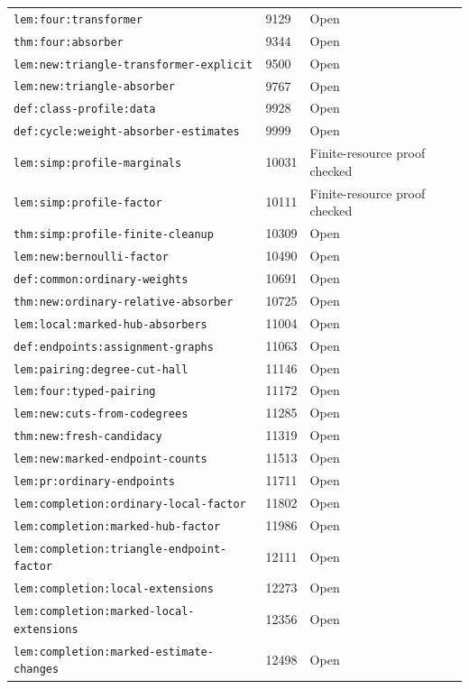 \begin{tabular}{lll}
\nolinkurl{lem:four:transformer} & 9129 & Open \\
\nolinkurl{thm:four:absorber} & 9344 & Open \\
\nolinkurl{lem:new:triangle-transformer-explicit} & 9500 & Open \\
\nolinkurl{lem:new:triangle-absorber} & 9767 & Open \\
\nolinkurl{def:class-profile:data} & 9928 & Open \\
\nolinkurl{def:cycle:weight-absorber-estimates} & 9999 & Open \\
\nolinkurl{lem:simp:profile-marginals} & 10031 & Finite-resource proof checked \\
\nolinkurl{lem:simp:profile-factor} & 10111 & Finite-resource proof checked \\
\nolinkurl{thm:simp:profile-finite-cleanup} & 10309 & Open \\
\nolinkurl{lem:new:bernoulli-factor} & 10490 & Open \\
\nolinkurl{def:common:ordinary-weights} & 10691 & Open \\
\nolinkurl{thm:new:ordinary-relative-absorber} & 10725 & Open \\
\nolinkurl{lem:local:marked-hub-absorbers} & 11004 & Open \\
\nolinkurl{def:endpoints:assignment-graphs} & 11063 & Open \\
\nolinkurl{lem:pairing:degree-cut-hall} & 11146 & Open \\
\nolinkurl{lem:four:typed-pairing} & 11172 & Open \\
\nolinkurl{lem:new:cuts-from-codegrees} & 11285 & Open \\
\nolinkurl{thm:new:fresh-candidacy} & 11319 & Open \\
\nolinkurl{lem:new:marked-endpoint-counts} & 11513 & Open \\
\nolinkurl{lem:pr:ordinary-endpoints} & 11711 & Open \\
\nolinkurl{lem:completion:ordinary-local-factor} & 11802 & Open \\
\nolinkurl{lem:completion:marked-hub-factor} & 11986 & Open \\
\nolinkurl{lem:completion:triangle-endpoint-factor} & 12111 & Open \\
\nolinkurl{lem:completion:local-extensions} & 12273 & Open \\
\nolinkurl{lem:completion:marked-local-extensions} & 12356 & Open \\
\nolinkurl{lem:completion:marked-estimate-changes} & 12498 & Open \\

\end{tabular}
